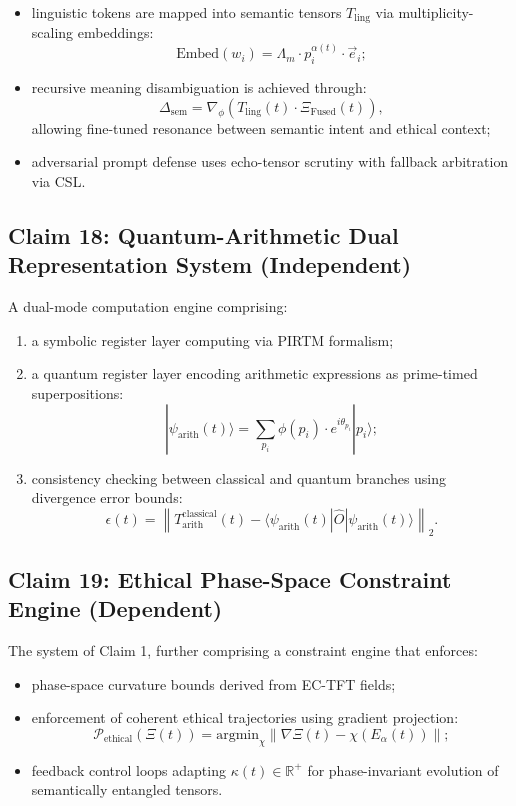 \documentclass[12pt]{article}
\begin{document}
\begin{itemize}
    \item linguistic tokens are mapped into semantic tensors \( T_{\text{ling}} \) via multiplicity-scaling embeddings:
    \[
    \text{Embed}(w_i) = \Lambda_m \cdot p_i^{\alpha(t)} \cdot \vec{e}_i;
    \]

    \item recursive meaning disambiguation is achieved through:
    \[
    \Delta_{\text{sem}} = \nabla_\phi \left( T_{\text{ling}}(t) \cdot \Xi_{\text{Fused}}(t) \right),
    \]
    allowing fine-tuned resonance between semantic intent and ethical context;

    \item adversarial prompt defense uses echo-tensor scrutiny with fallback arbitration via CSL.
\end{itemize}

\subsection*{Claim 18: Quantum-Arithmetic Dual Representation System (Independent)}

A dual-mode computation engine comprising:

\begin{enumerate}
    \item a symbolic register layer computing via PIRTM formalism;
    \item a quantum register layer encoding arithmetic expressions as prime-timed superpositions:
    \[
    |\psi_{\text{arith}}(t)\rangle = \sum_{p_i} \phi(p_i) \cdot e^{i \theta_{p_i}} |p_i\rangle;
    \]

    \item consistency checking between classical and quantum branches using divergence error bounds:
    \[
    \epsilon(t) = \left\| T_{\text{arith}}^{\text{classical}}(t) - \langle \psi_{\text{arith}}(t) | \hat{O} | \psi_{\text{arith}}(t) \rangle \right\|_2.
    \]
\end{enumerate}

\subsection*{Claim 19: Ethical Phase-Space Constraint Engine (Dependent)}

The system of Claim 1, further comprising a constraint engine that enforces:

\begin{itemize}
    \item phase-space curvature bounds derived from EC-TFT fields;
    
    \item enforcement of coherent ethical trajectories using gradient projection:
    \[
    \mathcal{P}_{\text{ethical}}(\Xi(t)) = \text{argmin}_\chi \left\| \nabla \Xi(t) - \chi(E_\alpha(t)) \right\|;
    \]

    \item feedback control loops adapting \( \kappa(t) \in \mathbb{R}^+ \) for phase-invariant evolution of semantically entangled tensors.
\end{itemize}
\end{document}
